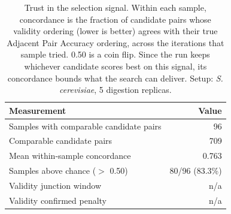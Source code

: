 \begin{table}[!tb]
  \centering
  \caption{Trust in the selection signal. Within each sample, concordance is the fraction of candidate pairs whose validity ordering (lower is better) agrees with their true Adjacent Pair Accuracy ordering, across the iterations that sample tried. 0.50 is a coin flip. Since the run keeps whichever candidate scores best on this signal, its concordance bounds what the search can deliver. Setup: \textnormal{\textnormal{\textit{S. cerevisiae}}}, 5 digestion replicas.}
  \label{tab:validity_concordance_yeast_r5}
  \begin{tabular}{lr}
    \toprule
    Measurement & Value \\
    \midrule
    Samples with comparable candidate pairs & 96 \\
    Comparable candidate pairs & 709 \\
    Mean within-sample concordance & 0.763 \\
    Samples above chance ($>$ 0.50) & 80/96 (83.3\%) \\
    Validity junction window & n/a \\
    Validity confirmed penalty & n/a \\
    \bottomrule
  \end{tabular}
\end{table}
